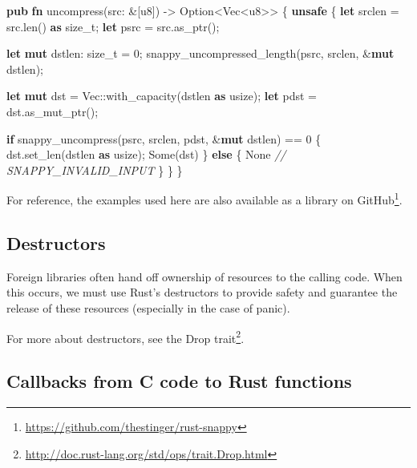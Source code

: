 \documentclass[a4paper,]{book}
\newenvironment{Shaded}{\begin{snugshade}}{\end{snugshade}}
\newcommand{\KeywordTok}[1]{\textcolor[rgb]{0.13,0.29,0.53}{\textbf{{#1}}}}
\newcommand{\DataTypeTok}[1]{\textcolor[rgb]{0.13,0.29,0.53}{{#1}}}
\newcommand{\DecValTok}[1]{\textcolor[rgb]{0.00,0.00,0.81}{{#1}}}
\newcommand{\ConstantTok}[1]{\textcolor[rgb]{0.00,0.00,0.00}{{#1}}}
\newcommand{\CommentTok}[1]{\textcolor[rgb]{0.56,0.35,0.01}{\textit{{#1}}}}
\newcommand{\NormalTok}[1]{{#1}}
\renewcommand{\href}[2]{#2\footnote{\url{#1}}}
\begin{document}
\begin{Shaded}
\begin{Highlighting}[]
\KeywordTok{pub} \KeywordTok{fn} \NormalTok{uncompress(src: &[}\DataTypeTok{u8}\NormalTok{]) -> }\DataTypeTok{Option}\NormalTok{<}\DataTypeTok{Vec}\NormalTok{<}\DataTypeTok{u8}\NormalTok{>> \{}
    \KeywordTok{unsafe} \NormalTok{\{}
        \KeywordTok{let} \NormalTok{srclen = src.len() }\KeywordTok{as} \DataTypeTok{size_t}\NormalTok{;}
        \KeywordTok{let} \NormalTok{psrc = src.as_ptr();}

        \KeywordTok{let} \KeywordTok{mut} \NormalTok{dstlen: }\DataTypeTok{size_t} \NormalTok{= }\DecValTok{0}\NormalTok{;}
        \NormalTok{snappy_uncompressed_length(psrc, srclen, &}\KeywordTok{mut} \NormalTok{dstlen);}

        \KeywordTok{let} \KeywordTok{mut} \NormalTok{dst = }\DataTypeTok{Vec}\NormalTok{::with_capacity(dstlen }\KeywordTok{as} \DataTypeTok{usize}\NormalTok{);}
        \KeywordTok{let} \NormalTok{pdst = dst.as_mut_ptr();}

        \KeywordTok{if} \NormalTok{snappy_uncompress(psrc, srclen, pdst, &}\KeywordTok{mut} \NormalTok{dstlen) == }\DecValTok{0} \NormalTok{\{}
            \NormalTok{dst.set_len(dstlen }\KeywordTok{as} \DataTypeTok{usize}\NormalTok{);}
            \ConstantTok{Some}\NormalTok{(dst)}
        \NormalTok{\} }\KeywordTok{else} \NormalTok{\{}
            \ConstantTok{None} \CommentTok{// SNAPPY_INVALID_INPUT}
        \NormalTok{\}}
    \NormalTok{\}}
\NormalTok{\}}
\end{Highlighting}
\end{Shaded}

For reference, the examples used here are also available as a
\href{https://github.com/thestinger/rust-snappy}{library on GitHub}.

\subsection{Destructors}\label{destructors}

Foreign libraries often hand off ownership of resources to the calling
code. When this occurs, we must use Rust's destructors to provide safety
and guarantee the release of these resources (especially in the case of
panic).

For more about destructors, see the
\href{http://doc.rust-lang.org/std/ops/trait.Drop.html}{Drop trait}.

\subsection{Callbacks from C code to Rust
functions}\label{callbacks-from-c-code-to-rust-functions}
\end{document}
